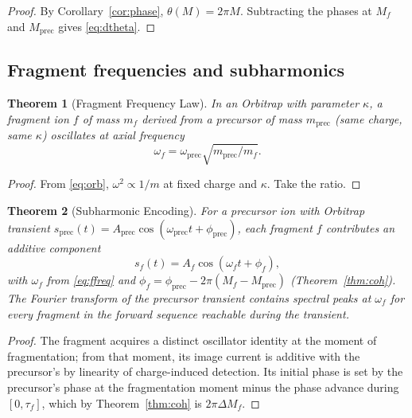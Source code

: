 \documentclass[twocolumn,10pt,a4paper]{article}
\theoremstyle{thmstyle}
\newtheorem{theorem}{Theorem}[section]
\theoremstyle{definition}
\theoremstyle{remark}
\begin{document}
\begin{proof}
By Corollary~\ref{cor:phase}, $\theta(M)=2\pi M$. Subtracting the
phases at $M_{f}$ and $M_{\mathrm{prec}}$ gives \eqref{eq:dtheta}.
\end{proof}

\subsection{Fragment frequencies and subharmonics}

\begin{theorem}[Fragment Frequency Law]
\label{thm:ffreq}
In an Orbitrap with parameter $\kappa$, a fragment ion $f$ of mass
$m_{f}$ derived from a precursor of mass $m_{\mathrm{prec}}$ (same
charge, same $\kappa$) oscillates at axial frequency
\begin{equation}
\omega_{f}=\omega_{\mathrm{prec}}\sqrt{m_{\mathrm{prec}}/m_{f}}.
\label{eq:ffreq}
\end{equation}
\end{theorem}

\begin{proof}
From \eqref{eq:orb}, $\omega^{2}\propto 1/m$ at fixed charge and
$\kappa$. Take the ratio.
\end{proof}

\begin{theorem}[Subharmonic Encoding]
\label{thm:sub}
For a precursor ion with Orbitrap transient
$s_{\mathrm{prec}}(t)=A_{\mathrm{prec}}\cos(\omega_{\mathrm{prec}}t+\phi_{\mathrm{prec}})$,
each fragment $f$ contributes an additive component
\begin{equation}
s_{f}(t)=A_{f}\cos(\omega_{f}t+\phi_{f}),
\label{eq:sub}
\end{equation}
with $\omega_{f}$ from \eqref{eq:ffreq} and
$\phi_{f}=\phi_{\mathrm{prec}}-2\pi(M_{f}-M_{\mathrm{prec}})$
(Theorem~\ref{thm:coh}). The Fourier transform of the precursor
transient contains spectral peaks at $\omega_{f}$ for every fragment
in the forward sequence reachable during the transient.
\end{theorem}

\begin{proof}
The fragment acquires a distinct oscillator identity at the moment of
fragmentation; from that moment, its image current is additive with
the precursor's by linearity of charge-induced detection. Its initial
phase is set by the precursor's phase at the fragmentation moment
minus the phase advance during $[0,\tau_{f}]$, which by
Theorem~\ref{thm:coh} is $2\pi\Delta M_{f}$.
\end{proof}
\end{document}
